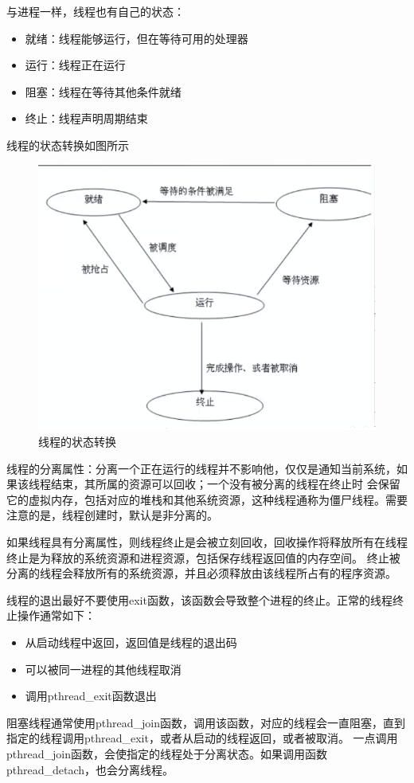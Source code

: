 与进程一样，线程也有自己的状态：
\begin{itemize}
  \item 就绪：线程能够运行，但在等待可用的处理器
  \item 运行：线程正在运行
  \item 阻塞：线程在等待其他条件就绪
  \item 终止：线程声明周期结束
\end{itemize}
线程的状态转换如图所示
\begin{figure}[H]
  \centering
  \includegraphics[width=\linewidth]{status_of_thread.png}
  \caption{线程的状态转换}
  \label{fig:status_of_thread}
\end{figure}

线程的分离属性：分离一个正在运行的线程并不影响他，仅仅是通知当前系统，如果该线程结束，其所属的资源可以回收；一个没有被分离的线程在终止时
会保留它的虚拟内存，包括对应的堆栈和其他系统资源，这种线程通称为僵尸线程。需要注意的是，线程创建时，默认是非分离的。

如果线程具有分离属性，则线程终止是会被立刻回收，回收操作将释放所有在线程终止是为释放的系统资源和进程资源，包括保存线程返回值的内存空间。
终止被分离的线程会释放所有的系统资源，并且必须释放由该线程所占有的程序资源。

线程的退出最好不要使用exit函数，该函数会导致整个进程的终止。正常的线程终止操作通常如下：
\begin{itemize}
  \item 从启动线程中返回，返回值是线程的退出码
  \item 可以被同一进程的其他线程取消
  \item 调用pthread\_exit函数退出
\end{itemize}

阻塞线程通常使用pthread\_join函数，调用该函数，对应的线程会一直阻塞，直到指定的线程调用pthread\_exit，或者从启动的线程返回，或者被取消。
一点调用pthread\_join函数，会使指定的线程处于分离状态。如果调用函数pthread\_detach，也会分离线程。
